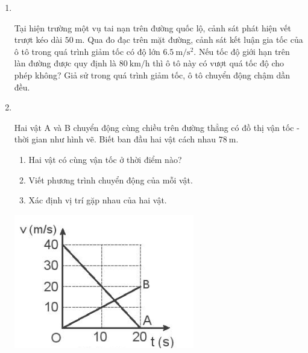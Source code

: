 \begin{enumerate}[label=\bfseries Bài \arabic*:,leftmargin=1.5cm]
\item{}\\
{Tại hiện trường một vụ tai nạn trên đường quốc lộ, cảnh sát phát hiện vết trượt kéo dài $\SI{50}{\meter}$. Qua đo đạc trên mặt đường, cảnh sát kết luận gia tốc của ô tô trong quá trình giảm tốc có độ lớn $\SI{6.5}{\meter/\second^2}$. Nếu tốc độ giới hạn trên làn đường được quy định là $\SI{80}{\kilo\meter/\hour}$ thì ô tô này có vượt quá tốc độ cho phép không? Giả sử trong quá trình giảm tốc, ô tô chuyển động chậm dần đều.

}


\item {}\\
{\begin{minipage}[l]{0.6\textwidth}
		Hai vật A và B chuyển động cùng chiều trên đường thẳng có đồ thị vận tốc - thời gian như hình vẽ. Biết ban đầu hai vật cách nhau $\SI{78}{\meter}$.
		\begin{enumerate}[label=\alph*)]
			\item Hai vật có cùng vận tốc ở thời điểm nào?
			\item Viết phương trình chuyển động của mỗi vật.
			\item Xác định vị trí gặp nhau của hai vật.
		\end{enumerate}
	\end{minipage}
\begin{minipage}{0.4\textwidth}
	\begin{center}
		\includegraphics[width=0.6\linewidth]{../figs/VN10-2023-PH-TP0003-10}
	\end{center}
\end{minipage}

}
\end{enumerate}
